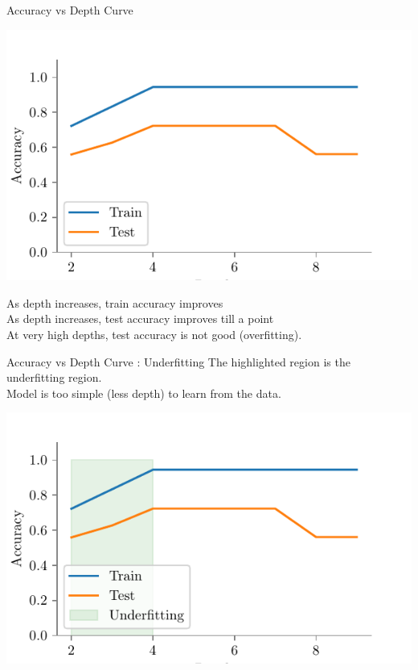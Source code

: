 \documentclass[usenames,dvipsnames]{beamer}
\begin{document}
\begin{frame}{Accuracy vs Depth Curve}
\begin{center}
\includegraphics[scale=0.55]{../assets/bias-variance/figures/bias-variance-accuracy-vs-depth.pdf}
\end{center}
\pause As depth increases, train accuracy improves\\
\pause As depth increases, test accuracy improves till a point\\
\pause At very high depths, test accuracy is not good (overfitting). 

\end{frame}

\begin{frame}{Accuracy vs Depth Curve : Underfitting}
The highlighted region is the underfitting region.\\
Model is too simple (less depth) to learn from the data. 
\begin{center}
\includegraphics{../assets/bias-variance/figures/bias-variance-accuracy-vs-depth-underfitting.pdf}
\end{center}
\end{frame}
\end{document}
